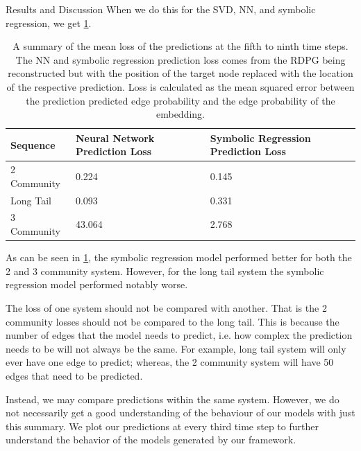 \documentclass[12pt]{amsbook}
\begin{document}
\begin{chapter}{Results and Discussion}
        When we do this for the SVD, NN, and symbolic regression, we get \cref{loss_table}.
        \begin{table}
            \begin{center}
                \begin{tabular}{| m{} | m{} | m{} |}
                    \hline
                    Sequence & Neural Network Prediction Loss & Symbolic Regression Prediction Loss\\ 
                    \hline
                    \hline
                    2 Community & 0.224 & 0.145 \\ 
                    \hline 
                    Long Tail  & 0.093 & 0.331 \\ 
                    \hline 
                    3 Community & 43.064 & 2.768 \\ 
                    \hline 
                \end{tabular}
                \end{center}
                \caption{A summary of the mean loss of the predictions at the fifth to ninth time steps. The NN and symbolic regression prediction loss comes from the RDPG being reconstructed but with the position of the target node replaced with the location of the respective prediction. Loss is calculated as the mean squared error between the prediction predicted edge probability and the edge probability of the embedding.}
                \label{loss_table}
        \end{table}

        As can be seen in \cref{loss_table}, the symbolic regression model performed better for both the 2 and 3 community system. However, for the long tail system the symbolic regression model performed notably worse. 

        The loss of one system should not be compared with another. That is the 2 community losses should not be compared to the long tail. This is because the number of edges that the model needs to predict, i.e. how complex the prediction needs to be will not always be the same. For example, long tail system will only ever have one edge to predict; whereas, the 2 community system will have 50 edges that need to be predicted.

        Instead, we may compare predictions within the same system. However, we do not necessarily get a good understanding of the behaviour of our models with just this summary. We plot our predictions at every third time step to further understand the behavior of the models generated by our framework.


\end{chapter}
\end{document}
